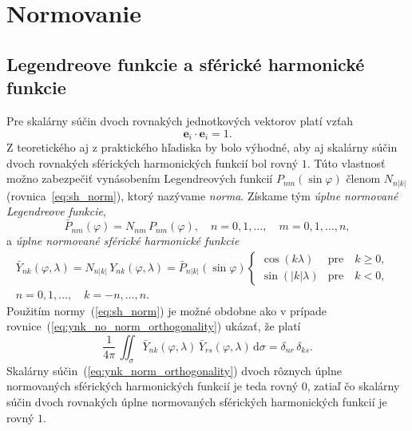 \documentclass[a4paper, 12pt]{book}
\newcommand{\diff}{\mathrm d}
\let\vec\mathbf
\begin{document}
\section{Normovanie}
\label{sec:normalization}

\subsection{Legendreove funkcie a sférické harmonické funkcie}

Pre skalárny súčin dvoch rovnakých jednotkových vektorov platí vzťah
%
\begin{equation}
\vec e_i \cdot \vec e_i = 1{.}
\end{equation}
%
Z teoretického aj z praktického hľadiska by bolo výhodné, aby aj skalárny súčin 
dvoch rovnakých sférických harmonických funkcií bol rovný $1$.  Túto vlastnosť 
možno zabezpečiť vynásobením Legendreových funkcií $P_{nm}(\sin\varphi)$ členom 
$N_{n|k|}$ (rovnica~\ref{eq:sh_norm}), ktorý nazývame \emph{norma}.  Získame 
tým \emph{úplne normované Legendreove funkcie},
%
\begin{equation}
\bar{P}_{nm}(\varphi) = N_{nm} \, P_{nm}(\varphi){,} \quad  n = 0, 1, \dots, 
\quad m = 0, 1, \dots, n{,}
\end{equation}
%
a \emph{úplne normované sférické harmonické funkcie}
%
\begin{equation}
\label{eq:ynk_norm}
\begin{split}
\bar{Y}_{nk}(\varphi, \lambda) = N_{n|k|} \, Y_{nk}(\varphi, \lambda) 
= \bar{P}_{n|k|}(\sin\varphi)
%
\begin{cases}
\cos(k\lambda)    &\text{pre} \quad k \geq 0{,}\\
\sin(|k|\lambda)  &\text{pre} \quad k < 0{,}
\end{cases}
&
%
\\
n = 0, 1, \dots, \quad k = -n, \dots, n{.}&
\end{split}
\end{equation}
%
Použitím normy~(\ref{eq:sh_norm}) je možné obdobne ako v prípade 
rovnice~(\ref{eq:ynk_no_norm_orthogonality}) ukázať, že platí
%
\begin{equation}
\label{eq:ynk_norm_orthogonality}
\frac{1}{4\pi} \, \iint_{\sigma} \bar{Y}_{nk}(\varphi, \lambda) \, 
\bar{Y}_{rs}(\varphi, \lambda) \, \diff \sigma = \delta_{nr} \, \delta_{ks}{.}
\end{equation}
%
Skalárny súčin~(\ref{eq:ynk_norm_orthogonality}) dvoch rôznych úplne 
normovaných sférických harmonických funkcií je teda rovný 0, zatiaľ čo skalárny 
súčin dvoch rovnakých úplne normovaných sférických harmonických funkcií je 
rovný $1$.
\end{document}
